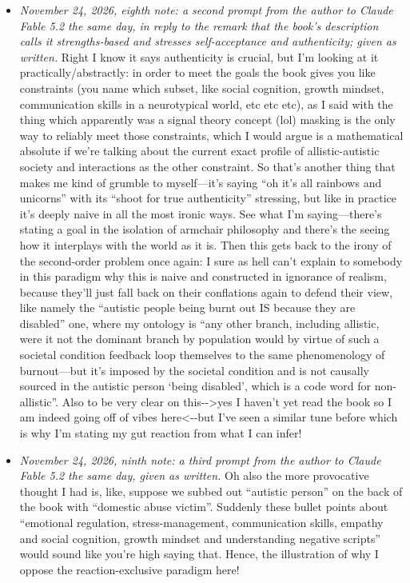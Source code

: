 \begin{itemize}
\item \emph{November 24, 2026, eighth note: a second prompt from the author to Claude Fable 5.2 the same day, in reply to the remark that the book's description calls it strengths-based and stresses self-acceptance and authenticity; given as written.} Right I know it says authenticity is crucial, but I'm looking at it practically/abstractly: in order to meet the goals the book gives you like constraints (you name which subset, like social cognition, growth mindset, communication skills in a neurotypical world, etc etc etc), as I said with the thing which apparently was a signal theory concept (lol) masking is the only way to reliably meet those constraints, which I would argue is a mathematical absolute if we're talking about the current exact profile of allistic-autistic society and interactions as the other constraint. So that's another thing that makes me kind of grumble to myself---it's saying ``oh it's all rainbows and unicorns'' with its ``shoot for true authenticity'' stressing, but like in practice it's deeply naive in all the most ironic ways. See what I'm saying---there's stating a goal in the isolation of armchair philosophy and there's the seeing how it interplays with the world as it is. Then this gets back to the irony of the second-order problem once again: I sure as hell can't explain to somebody in this paradigm why this is naive and constructed in ignorance of realism, because they'll just fall back on their conflations again to defend their view, like namely the ``autistic people being burnt out IS because they are disabled'' one, where my ontology is ``any other branch, including allistic, were it not the dominant branch by population would by virtue of such a societal condition feedback loop themselves to the same phenomenology of burnout---but it's imposed by the societal condition and is not causally sourced in the autistic person `being disabled', which is a code word for non-allistic''. Also to be very clear on this-{}-\textgreater{}yes I haven't yet read the book so I am indeed going off of vibes here\textless{}-{}-but I've seen a similar tune before which is why I'm stating my gut reaction from what I can infer!
\item \emph{November 24, 2026, ninth note: a third prompt from the author to Claude Fable 5.2 the same day, given as written.} Oh also the more provocative thought I had is, like, suppose we subbed out ``autistic person'' on the back of the book with ``domestic abuse victim''. Suddenly these bullet points about ``emotional regulation, stress-management, communication skills, empathy and social cognition, growth mindset and understanding negative scripts'' would sound like you're high saying that. Hence, the illustration of why I oppose the reaction-exclusive paradigm here!

\end{itemize}
